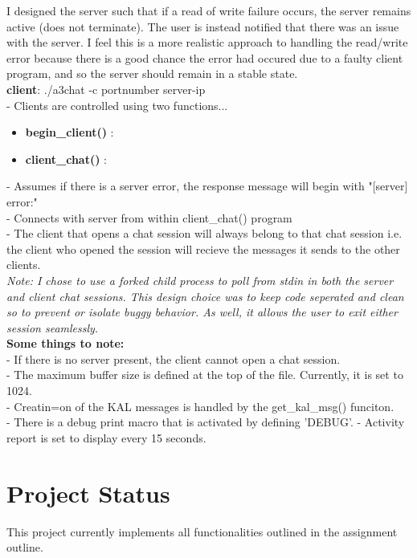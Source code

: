 \documentclass{article}
\begin{document}
\noindent
I designed the server such that if a read of write failure
occurs, the server remains active (does not terminate).
The user is instead notified that there was an issue with
the server. I feel this is a more realistic approach to
handling the read/write error because there is a good
chance the error had occured due to a faulty client
program, and so the server should remain in a stable state. \\

\noindent
\textbf{client}: ./a3chat -c portnumber server-ip \\
- Clients are controlled using two functions...

\begin{itemize}
  \item \textbf{ begin\_client() }:
  \item \textbf{ client\_chat() }:
\end{itemize}

\noindent
- Assumes if there is a server error, the response
message will begin with "[server] error:"\\
- Connects with server from within client\_chat() program\\
- The client that opens a chat session will always
belong to that chat session i.e. the client
who opened the session will recieve the messages
it sends to the other clients. \\

\noindent
\textit{Note: I chose to use a forked child process to poll
from stdin in both the server and client chat sessions. This
design choice was to keep code seperated and clean so to
prevent or isolate buggy behavior. As well, it allows the
user to exit either session seamlessly.} \\

\noindent
\textbf{ Some things to note: } \\
  - If there is no server present, the client cannot open a chat session. \\
  - The maximum buffer size is defined at the top of the file. Currently, it
    is set to 1024. \\
  - Creatin=on of the KAL messages is handled by the get\_kal\_msg() funciton. \\
  - There is a debug print macro that is activated by defining 'DEBUG'.
  - Activity report is set to display every 15 seconds. \\

\section{Project Status}
This project currently implements all functionalities outlined in the
assignment outline. \\
\end{document}
